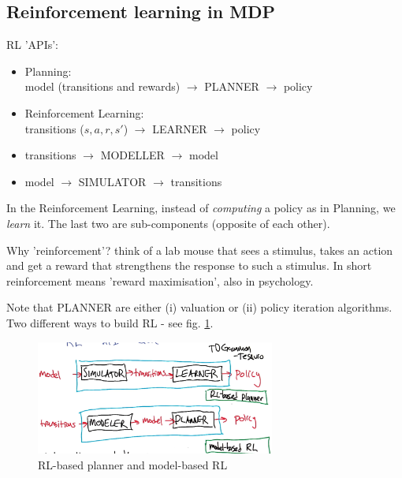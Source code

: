 \documentclass[11pt]{article}
\begin{document}
\subsection{Reinforcement learning in MDP}
RL 'APIs': \\
\begin{itemize}
	\item Planning: \\model (transitions and rewards) $\rightarrow$ PLANNER $\rightarrow$ policy 
	\item Reinforcement Learning: \\ transitions ($s, a, r, s'$) $\rightarrow$ LEARNER $\rightarrow$ policy
	\item transitions   $\rightarrow$ MODELLER $\rightarrow$ model
	\item model $\rightarrow$ SIMULATOR $\rightarrow$ transitions
\end{itemize}

In the Reinforcement Learning, instead of \textit{computing} a policy as in Planning, we \textit{learn} it. The last two are sub-components (opposite of each other).

Why 'reinforcement'? think of a lab mouse that sees a stimulus, takes an action and get a reward that strengthens the response to such a stimulus. In short reinforcement means 'reward maximisation', also in psychology.


Note that PLANNER are either (i) valuation or (ii) policy iteration algorithms. Two different ways to build RL - see fig. \ref{RL_approaches}.
\begin{figure}[htbp] 
	\centering
	\includegraphics[width=0.7\textwidth]{pics/RL_approaches}
	\caption{RL-based planner and model-based RL} 
	\label{RL_approaches}
\end{figure}
\end{document}
